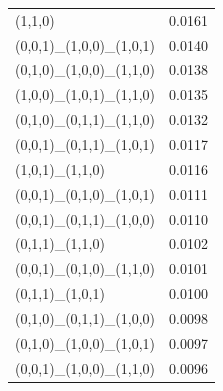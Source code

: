 \documentclass[11pt]{article}
\begin{document}
\begin{minipage}[t]{\linewidth}
\begin{tabular}{@{}lr@{}}
(1,1,0)                                            & 0.0161 \\
(0,0,1)\_(1,0,0)\_(1,0,1)                         & 0.0140 \\
(0,1,0)\_(1,0,0)\_(1,1,0)                         & 0.0138 \\
(1,0,0)\_(1,0,1)\_(1,1,0)                         & 0.0135 \\
(0,1,0)\_(0,1,1)\_(1,1,0)                         & 0.0132 \\
(0,0,1)\_(0,1,1)\_(1,0,1)                         & 0.0117 \\
(1,0,1)\_(1,1,0)                                   & 0.0116 \\
(0,0,1)\_(0,1,0)\_(1,0,1)                         & 0.0111 \\
(0,0,1)\_(0,1,1)\_(1,0,0)                         & 0.0110 \\
(0,1,1)\_(1,1,0)                                   & 0.0102 \\
(0,0,1)\_(0,1,0)\_(1,1,0)                         & 0.0101 \\
(0,1,1)\_(1,0,1)                                   & 0.0100 \\
(0,1,0)\_(0,1,1)\_(1,0,0)                         & 0.0098 \\
(0,1,0)\_(1,0,0)\_(1,0,1)                         & 0.0097 \\
(0,0,1)\_(1,0,0)\_(1,1,0)                         & 0.0096 \\
\bottomrule
\end{tabular}
\end{minipage}
\hfill
\end{document}
